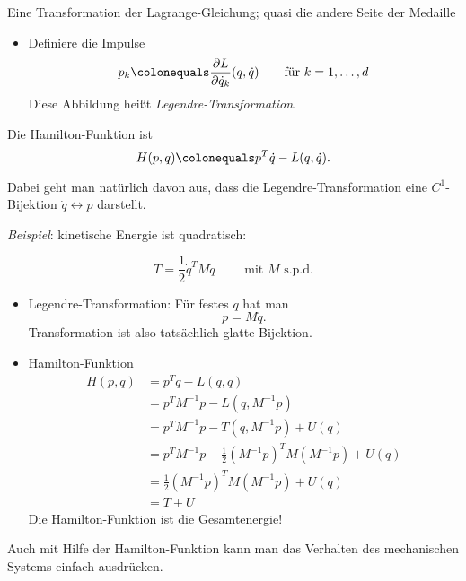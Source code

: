 Eine Transformation der Lagrange-Gleichung;
quasi \glqq die andere Seite der Medaille\grqq

\begin{itemize}
\item Definiere die Impulse
  \begin{equation*}
    p_k \colonequals \frac{\partial L}{\partial \dot q_k}(q, \dot q) \qquad \text{für } k = 1, \dots, d
  \end{equation*}
  Diese Abbildung heißt \emph{Legendre-Transformation}.
\end{itemize}

\begin{definition}
  Die Hamilton-Funktion ist
  \begin{equation*}
    H(p, q) \colonequals p^T \dot q - L(q, \dot q).
  \end{equation*}
\end{definition}

Dabei geht man natürlich davon aus, dass die Legendre-Transformation eine $C^1$-Bijektion $\dot q \leftrightarrow p$ darstellt.

\emph{Beispiel}: kinetische Energie ist quadratisch:

\begin{equation*}
  T = \frac 12 \dot q^T M \dot q \qquad \text{ mit $M$ s.p.d.}
\end{equation*}

\begin{itemize}
\item Legendre-Transformation: Für festes $q$ hat man
  \begin{equation*}
    p = M \dot q.
  \end{equation*}
  Transformation ist also tatsächlich glatte Bijektion.
\item Hamilton-Funktion
  \begin{align*}
    H(p, q)
    & = p^T \dot q - L(q, \dot q) \\
    & = p^T M^{-1} p - L(q, M^{-1} p) \\
    & = p^T M^{-1} p - T(q, M^{-1} p) + U(q) \\
    & = p^T M^{-1} p - \frac12 (M^{-1}p)^T M (M^{-1} p) + U(q) \\
    & = \frac12 (M^{-1}p)^T M (M^{-1}p) + U(q) \\
    & = T + U
  \end{align*}
  Die Hamilton-Funktion ist die Gesamtenergie!
\end{itemize}

Auch mit Hilfe der Hamilton-Funktion kann man das Verhalten des mechanischen Systems einfach ausdrücken.

